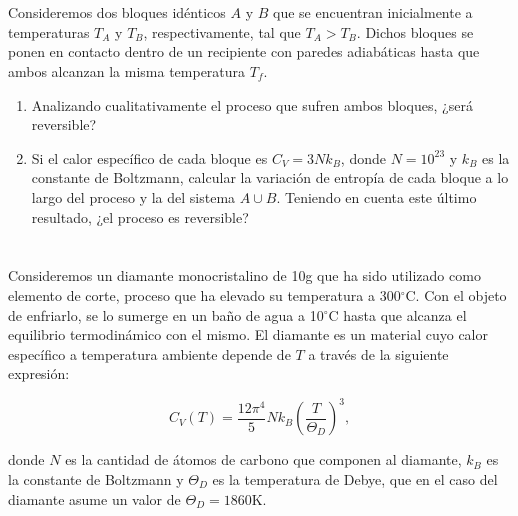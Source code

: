 \documentclass[a4paper,11pt]{article}
\begin{document}
\section{}

Consideremos dos bloques idénticos $A$ y $B$ que se encuentran 
inicialmente a temperaturas $T_A$ y $T_B$, respectivamente, tal que 
$T_A > T_B$. Dichos bloques se ponen en contacto dentro de un 
recipiente con paredes adiabáticas hasta que ambos alcanzan la misma 
temperatura $T_f$.

\begin{enumerate}[label=(\alph*),
                  leftmargin=2\parindent,
                  rightmargin=2\parindent]

    \item{Analizando cualitativamente el proceso que sufren ambos 
          bloques, ¿será reversible?}
    
    \item{Si el calor específico de cada bloque es $C_V = 3 N k_B$,
          donde $N = 10^{23}$ y $k_B$ es la constante de Boltzmann, 
          calcular la variación de entropía de cada bloque a lo largo 
          del proceso y la del sistema $A \cup B$. 
          Teniendo en cuenta este último resultado, ¿el proceso es 
          reversible?}

\end{enumerate}


\section{}

Consideremos un diamante monocristalino de 10g que ha sido utilizado 
como elemento de corte, proceso que ha elevado su temperatura a 
300$^\circ$C.
Con el objeto de enfriarlo, se lo sumerge en un baño de agua a 
10$^\circ$C hasta que alcanza el equilibrio termodinámico con el mismo.
El diamante es un material cuyo calor específico a temperatura 
ambiente depende de $T$ a través de la siguiente expresión:

$$ C_V(T) = \frac{12\pi^4}{5} N k_B \left( \frac{T}{\Theta_D} \right)^3, $$

\noindent donde $N$ es la cantidad de átomos de carbono que componen 
al diamante, $k_B$ es la constante de Boltzmann y $\Theta_D$ es la 
temperatura de Debye, que en el caso del diamante asume un valor de 
$\Theta_D = 1860$K.
\end{document}

